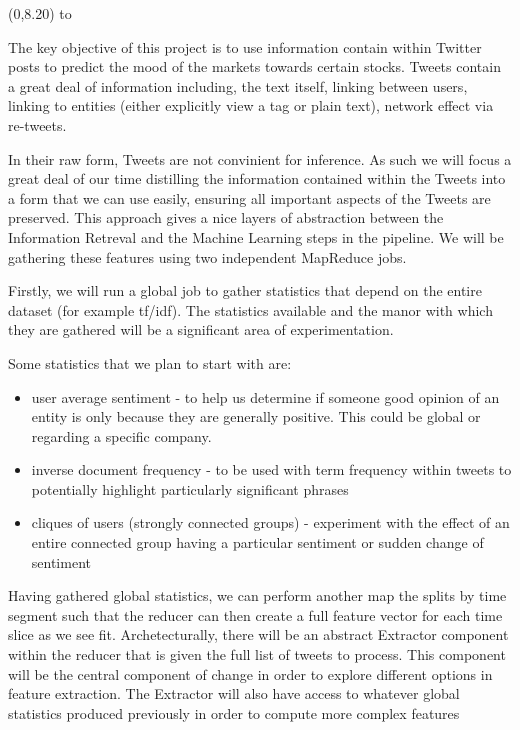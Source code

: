 \documentclass[a0]{a0poster}
\def\Head#1{\noindent\hbox to \hsize{\hfil{\LARGE\color{DarkBlue}\sf #1}}\bigskip}
\def\Subhead#1{\noindent{\large\color{DarkBlue}\sf #1}\bigskip}
\begin{document}
\begin{textblock}{7}(0,8.20)
\Head{Feature Extraction}

\sf
The key objective of this project is to use information contain within Twitter posts to predict the mood of the markets towards certain stocks. 
Tweets contain a great deal of information including, the text itself, linking between users, linking to entities (either explicitly view a tag or plain text), network effect via re-tweets.

In their raw form, Tweets are not convinient for inference. As such we will focus a great deal of our time distilling the information contained within the Tweets into a form that we can use easily, ensuring all important aspects of the Tweets are preserved.
This approach gives a nice layers of abstraction between the Information Retreval and the Machine Learning steps in the pipeline. 
We will be gathering these features using two independent MapReduce jobs.


\Subhead{Global Statistics}

\sf
Firstly, we will run a global job to gather statistics that depend on the entire dataset (for example tf/idf).
The statistics available and the manor with which they are gathered will be a significant area of experimentation.

Some statistics that we plan to start with are:
\begin{itemize}
\item user average sentiment - to help us determine if someone good opinion of an entity is only because they are generally positive. This could be global or regarding a specific company.
\item inverse document frequency - to be used with term frequency within tweets to potentially highlight particularly significant phrases
\item cliques of users (strongly connected groups) - experiment with the effect of an entire connected group having a particular sentiment or sudden change of sentiment
\end{itemize}

\Subhead{Extractor}

Having gathered global statistics, we can perform another map the splits by time segment such that the reducer can then create a full feature vector for each time slice as we see fit.
Archetecturally, there will be an abstract Extractor component within the reducer that is given the full list of tweets to process.
This component will be the central component of change in order to explore different options in feature extraction.
The Extractor will also have access to whatever global statistics produced previously in order to compute more complex features


\end{textblock}
\end{document}
